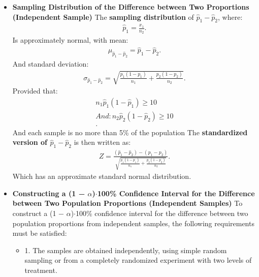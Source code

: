 \documentclass{report}
\begin{document}
    \begin{itemize}
        \item \textbf{Sampling Distribution of the Difference between Two Proportions (Independent Sample)} 
            \bigbreak \noindent 
         The \textbf{sampling distribution} of $\hat{p}_{1} - \hat{p}_{2}$, where:
            \begin{align*}
                \hat{p}_{1} = \frac{x_{1}}{n_{2}} 
            .\end{align*}
            Is approximately normal, with mean:
            \begin{align*}
                \mu_{\hat{p}_{1}- \hat{p}_{2}} = \hat{p}_{1} - \hat{p}_{2}
            .\end{align*}
            And standard deviation:
            \begin{align*}
                \sigma_{\hat{p}_{1} - \hat{p}_{2}} =  \sqrt{\frac{p_{1}(1-p_{1})}{n_{1}} + \frac{p_{2}(1-p_{2})}{n_{2}}}
            .\end{align*}
            Provided that:
            \begin{align*}
                n_{1}\hat{p}_{1}(1-\hat{p}_{1}) \geq 10 \\
                And: n_{2}\hat{p}_{2}(1-\hat{p}_{2}) \geq 10 \\
            .\end{align*}
            And each sample is no more than 5\% of the population
            \bigbreak \noindent 
        The \textbf{standardized version of $\hat{p}_{1} - \hat{p}_{2}$} is then written as:
            \begin{align*}
                Z = \frac{(\hat{p}_{1} -\hat{p}_{2}) - (p_{1} - p_{2})}{\sqrt{\frac{p_{1}(1-p_{1})}{n_{1}} + \frac{p_{2}(1-p_{2})}{n_{2}}}}
            .\end{align*}
        Which has an approximate standard normal distribution.
    \item \textbf{Constructing a (1 − $\alpha$)$\cdot  $100\% Confidence Interval for the Difference between Two Population Proportions (Independent Samples)}
        \bigbreak \noindent 
        To construct a (1 − $\alpha $)$\cdot  $100\% confidence interval for the difference between two population proportions from independent samples, the following requirements must be satisfied:
        \begin{itemize}
            \item 1. The samples are obtained independently, using simple random sampling or from a completely randomized experiment with two levels of treatment.

\end{itemize}
\end{itemize}
\end{document}
